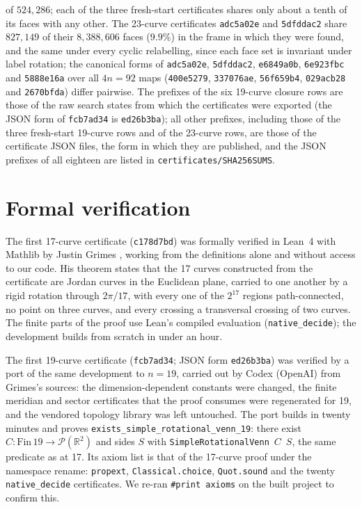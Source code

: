 \documentclass[11pt]{article}
\begin{document}
\begin{table}[h]
{of $524{,}286$; each of the three fresh-start certificates shares only about a tenth of its faces with any other.
The 23-curve certificates \texttt{adc5a02e} and \texttt{5dfddac2} share $827{,}149$ of their
$8{,}388{,}606$ faces ($9.9\%$) in the frame in which they were found, and the same under every cyclic relabelling,
since each face set is invariant under label rotation; the canonical forms of \texttt{adc5a02e}, \texttt{5dfddac2},
\texttt{e6849a0b}, \texttt{6e923fbc} and \texttt{5888e16a} over all $4n=92$ maps (\texttt{400e5279}, \texttt{337076ae},
\texttt{56f659b4}, \texttt{029acb28} and \texttt{2670bfda}) differ pairwise. The prefixes of the six 19-curve closure
rows are those of the raw search
states from which the certificates were exported (the JSON form of \texttt{fcb7ad34} is \texttt{ed26b3ba}); all other
prefixes, including those of the three fresh-start 19-curve rows and of the 23-curve rows, are those of the certificate
JSON files, the form in which they are published, and the JSON prefixes of all eighteen are listed in
\texttt{certificates/SHA256SUMS}.}
\end{table}

\section{Formal verification}\label{sec:lean}
The first 17-curve certificate (\texttt{c178d7bd}) was formally verified in Lean~4 with Mathlib by Justin Grimes \cite{Gri26},
working from the definitions alone and without access to our code. His theorem states that the 17 curves
constructed from the certificate are Jordan curves in the Euclidean plane, carried to one another by a rigid
rotation through $2\pi/17$, with every one of the $2^{17}$ regions path-connected, no point on three curves, and every
crossing a transversal crossing of two curves. The finite parts of the proof use Lean's compiled evaluation
(\texttt{native\_decide}); the development builds from scratch in under an hour.

The first 19-curve certificate (\texttt{fcb7ad34}; JSON form \texttt{ed26b3ba}) was verified by a port of the same
development to $n=19$, carried out by Codex (OpenAI) from Grimes's sources: the dimension-dependent constants were
changed, the finite meridian and sector certificates that the proof consumes were regenerated for 19, and the
vendored topology library was left untouched. The port builds in twenty minutes and proves
\texttt{exists\_simple\_rotational\_venn\_19}: there exist $C:\mathrm{Fin}\,19\to\mathcal P(\mathbb R^2)$ and sides $S$
with \texttt{SimpleRotationalVenn}~$C$~$S$, the same predicate as at 17. Its axiom list is that of the 17-curve proof
under the namespace rename: \texttt{propext}, \texttt{Classical.choice}, \texttt{Quot.sound} and the twenty
\texttt{native\_decide} certificates. We re-ran \texttt{\#print axioms} on the built project to confirm this.
\end{document}
